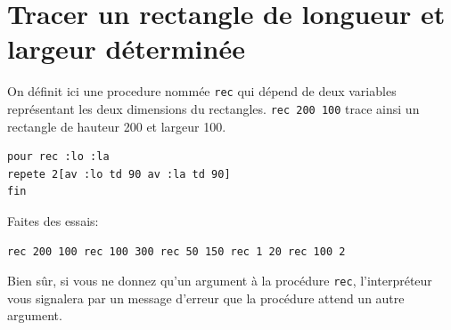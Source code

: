  \section{Tracer un rectangle de longueur et largeur déterminée}
 \noindent On définit ici une procedure nommée \texttt{rec} qui dépend de deux variables représentant les deux dimensions du rectangles. \texttt{rec 200 100} trace ainsi un rectangle de hauteur 200 et largeur 100.
 \begin{verbatim}
pour rec :lo :la
repete 2[av :lo td 90 av :la td 90]
fin
\end{verbatim} 
Faites des essais: 
\begin{verbatim}
rec 200 100 rec 100 300 rec 50 150 rec 1 20 rec 100 2 
\end{verbatim}
Bien sûr, si vous ne donnez qu'un argument à la procédure \texttt{rec}, l'interpréteur vous signalera par un message d'erreur que la procédure attend un autre argument.
